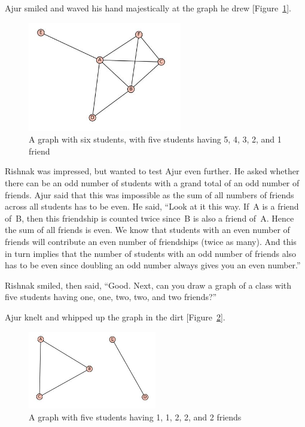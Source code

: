 Ajur smiled and waved his hand majestically at the graph he drew [Figure~\ref{dg2}].

\begin{figure}
\begin{center}
\includegraphics[width=0.6\textwidth]{graphstory1-1.JPG}
\caption{A graph with six students, with five students having 5, 4, 3, 2, and 1 friend}\label{dg2}
\end{center}
\end{figure}

Rishnak was impressed, but wanted to test Ajur even further. He asked whether there can be an odd number of students with a grand total of an odd number of friends. Ajur said that this was impossible as the sum of all numbers of friends across all students has to be even. He said, ``Look at it this way. If~A is a friend of~B, then this friendship is counted twice since~B is also a friend of~A. Hence the sum of all friends is even. We know that students with an even number of friends will contribute an even number of friendships (twice as many). And this in turn implies that the number of students with an odd number of friends also has to be even since doubling an odd number always gives you an even number.''

Rishnak smiled, then said, ``Good. Next, can you draw a graph of a class with five students having one, one, two, two, and two friends?''

Ajur knelt and whipped up the graph in the dirt [Figure~\ref{dg3}].

\begin{figure}
\begin{center}
\includegraphics[width=0.5\textwidth]{graphstory1-2.JPG}
\caption{A graph with five students having 1, 1, 2, 2, and 2 friends}\label{dg3}
\end{center}
\end{figure}

